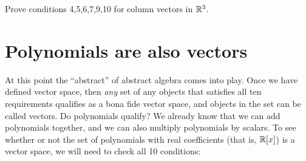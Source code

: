 %
%

\begin{exercise}{}
Prove conditions 4,5,6,7,9,10 for column vectors in $\mathbb{R}^3$.
\end{exercise}
\section{Polynomials are also vectors}
\label{sec:ExploringPolynomials:PolynomialsAreVectors}

At this point the ``abstract''  of abstract algebra comes into play. Once we have defined vector space, then \emph{any} set of any objects that satisfies all ten requirements qualifies as a bona fide vector space, and objects in the set can be called vectors. Do polynomials qualify? We already know that we can add polynomials together, and we can also multiply polynomials by  scalars. To see whether or not the set of polynomials with real coefficients (that is, $\mathbb{R}[x]$) is a vector space, we will need to check all 10 conditions: 
\medskip{}

